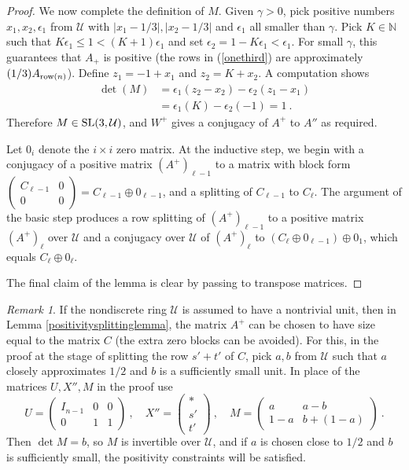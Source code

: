 \documentclass{amsart}
\theoremstyle{definition}
\theoremstyle{remark}
\newtheorem{remark}[theorem]{Remark}
\numberwithin{equation}{section}
\begin{document}
{{\begin{proof}
We now complete the definition of $M$. 
Given $\gamma>0$, pick positive numbers $x_1, x_2, \epsilon_1$ from 
$\mathcal U$ with $|x_1-1/3|, |x_2 - 1/3|$ and $\epsilon_1$ all smaller 
than $\gamma$.  Pick $K\in \mathbb N$ 
such that $K\epsilon_1 \leq 1< (K+1)\epsilon_1$ and set $\epsilon_2= 1-K\epsilon_1
< \epsilon_1$. For small $\gamma$, this guarantees that $A_+$ is positive 
(the rows in (\ref{onethird}) are approximately 
$(1/3)A_{\textnormal{row}(n)}$).   
 Define $z_1 = -1+x_1$ and $z_2 = K+x_2$. 
A computation shows 
\begin{align*}  
\det(M) &= \epsilon_1(z_2-x_2) - \epsilon_2 (z_1-x_1) \\ 
&= \epsilon_1(K) - \epsilon_2(-1) = 1 \ . 
\end{align*} 
Therefore $M\in \textnormal{SL}(3,\mathcal U)$, and $W^+$ gives a conjugacy of 
$A^+$ to $A''$ as required. 

Let $0_i$ denote the  $i\times i$ zero matrix. 
At the inductive step,
 we begin with a conjugacy of a positive matrix $(A^+)_{\ell -1}$ to a matrix 
with block form 
$
\left(\begin{smallmatrix} C_{\ell -1} & 0 \\ 0& 0 
\end{smallmatrix}\right) 
=C_{\ell -1}\oplus 0_{\ell -1}$, and a splitting of $C_{\ell -1}$ to $C_{\ell}$. 
The argument of the basic step produces a 
row splitting    of $(A^+)_{\ell -1}$
to a positive matrix $(A^+)_{\ell} $ over $\mathcal U$ 
and a conjugacy  over $\mathcal U$ of 
$(A^+)_{\ell} $ 
to $(C_{\ell}\oplus 0_{\ell -1})\oplus 0_1$, which equals 
$C_{\ell}\oplus 0_{\ell}$. 

The final claim of the lemma is clear by passing to transpose matrices. 
\end{proof}


\begin{remark} \label{ifunit} 
If the nondiscrete ring $\mathcal U$ is assumed to have a nontrivial 
unit, then in Lemma 
\ref{positivitysplittinglemma}, the matrix $A^+$ can be chosen to have 
size equal to the matrix $C$ (the extra zero blocks can be avoided). 
For this, in the proof at the stage of splitting the row 
$s'+t'$ of $C$, pick $a,b$ from $\mathcal U$ such that 
$a$ closely approximates $1/2$ and $b$ is a sufficiently small unit. 
In place of the matrices $U,X'',M$ in the proof use 
\[
U = \begin{pmatrix} I_{n-1} & 0&0\\ 0&  1 & 1 
\end{pmatrix} \ , \quad 
X''= 
\begin{pmatrix}
* \\ 
s' \\ 
t' 
\end{pmatrix} \ , \quad 
M= \begin{pmatrix}
             a &a-b\\
           1-a  &b+(1-a)
   \end{pmatrix}\  . 
\] 
Then $\det M =b$, so $M$ is invertible over $\mathcal U$,  
and if $a$ is chosen close to $1/2$ and $b$ is sufficiently small, 
the positivity constraints will be satisfied.  
\end{remark} 


}}
\end{document}
